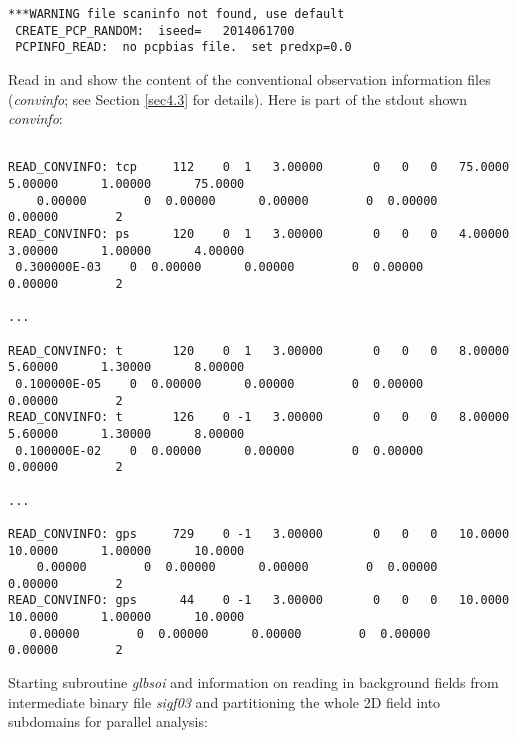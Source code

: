 \begin{scriptsize}
\begin{verbatim}
***WARNING file scaninfo not found, use default
 CREATE_PCP_RANDOM:  iseed=   2014061700
 PCPINFO_READ:  no pcpbias file.  set predxp=0.0
\end{verbatim}
\end{scriptsize}
Read in and show the content of the conventional observation information files (\textit{convinfo}; see Section \ref{sec4.3} for details). Here is part of the stdout shown \textit{convinfo}:
\begin{tiny}
\begin{verbatim} 

READ_CONVINFO: tcp     112    0  1   3.00000       0   0   0   75.0000      5.00000      1.00000      75.0000  
    0.00000        0  0.00000      0.00000        0  0.00000      0.00000        2
READ_CONVINFO: ps      120    0  1   3.00000       0   0   0   4.00000      3.00000      1.00000      4.00000    
 0.300000E-03    0  0.00000      0.00000        0  0.00000      0.00000        2

...

READ_CONVINFO: t       120    0  1   3.00000       0   0   0   8.00000      5.60000      1.30000      8.00000    
 0.100000E-05    0  0.00000      0.00000        0  0.00000      0.00000        2
READ_CONVINFO: t       126    0 -1   3.00000       0   0   0   8.00000      5.60000      1.30000      8.00000    
 0.100000E-02    0  0.00000      0.00000        0  0.00000      0.00000        2

...

READ_CONVINFO: gps     729    0 -1   3.00000       0   0   0   10.0000      10.0000      1.00000      10.0000  
    0.00000        0  0.00000      0.00000        0  0.00000      0.00000        2
READ_CONVINFO: gps      44    0 -1   3.00000       0   0   0   10.0000      10.0000      1.00000      10.0000   
   0.00000        0  0.00000      0.00000        0  0.00000      0.00000        2

\end{verbatim}
\end{tiny}
Starting subroutine \textit{glbsoi} and information on reading in background fields from intermediate binary file \textit{sigf03} and partitioning the whole 2D field into subdomains for parallel analysis:

